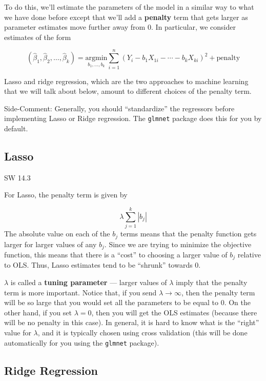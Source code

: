 \documentclass[
  letterpaper,
  DIV=11,
  numbers=noendperiod]{scrreprt}
\begin{document}
To do this, we'll estimate the parameters of the model in a similar way
to what we have done before except that we'll add a \textbf{penalty}
term that gets larger as parameter estimates move further away from 0.
In particular, we consider estimates of the form

\[
  (\hat{\beta}_1, \hat{\beta}_2, \ldots, \hat{\beta}_k) = \underset{b_1,\ldots,b_k}{\textrm{argmin}} \sum_{i=1}^n  (Y_i - b_1 X_{1i} - \cdots - b_k X_{ki})^2 + \textrm{penalty}
\]

Lasso and ridge regression, which are the two approaches to machine
learning that we will talk about below, amount to different choices of
the penalty term.

{Side-Comment:} Generally, you should ``standardize'' the regressors
before implementing Lasso or Ridge regression. The \texttt{glmnet}
package does this for you by default.

\subsection{Lasso}\label{lasso}

SW 14.3

For Lasso, the penalty term is given by

\[
  \lambda \sum_{j=1}^k |b_j|
\] The absolute value on each of the \(b_j\) terms means that the
penalty function gets larger for larger values of any \(b_j\). Since we
are trying to minimize the objective function, this means that there is
a ``cost'' to choosing a larger value of \(b_j\) relative to OLS. Thus,
Lasso estimates tend to be ``shrunk'' towards 0.

\(\lambda\) is called a \textbf{tuning parameter} --- larger values of
\(\lambda\) imply that the penalty term is more important. Notice that,
if you send \(\lambda \rightarrow \infty\), then the penalty term will
be so large that you would set all the parameters to be equal to 0. On
the other hand, if you set \(\lambda=0\), then you will get the OLS
estimates (because there will be no penalty in this case). In general,
it is hard to know what is the ``right'' value for \(\lambda\), and it
is typically chosen using cross validation (this will be done
automatically for you using the \texttt{glmnet} package).

\subsection{Ridge Regression}\label{ridge-regression}
\end{document}
